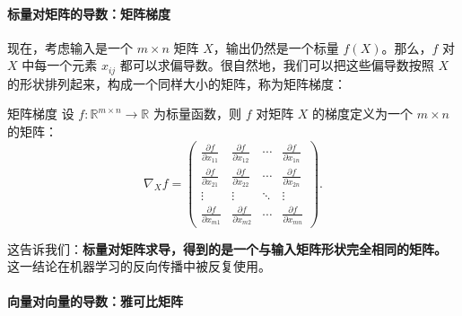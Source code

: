 \paragraph{标量对矩阵的导数：矩阵梯度}

现在，考虑输入是一个 $m \times n$ 矩阵 $X$，输出仍然是一个标量 $f(X)$。那么，$f$ 对 $X$ 中每一个元素 $x_{ij}$ 都可以求偏导数。很自然地，我们可以把这些偏导数按照 $X$ 的形状排列起来，构成一个同样大小的矩阵，称为矩阵梯度：
\begin{definition}{矩阵梯度}{}
    设 $f: \mathbb{R}^{m \times n} \to \mathbb{R}$ 为标量函数，则 $f$ 对矩阵 $X$ 的梯度定义为一个 $m \times n$ 的矩阵：
    \begin{equation}
        \nabla_X f =
        \begin{pmatrix}
            \frac{\partial f}{\partial x_{11}} & \frac{\partial f}{\partial x_{12}} & \cdots & \frac{\partial f}{\partial x_{1n}} \\[4pt]
            \frac{\partial f}{\partial x_{21}} & \frac{\partial f}{\partial x_{22}} & \cdots & \frac{\partial f}{\partial x_{2n}} \\
            \vdots & \vdots & \ddots & \vdots \\
            \frac{\partial f}{\partial x_{m1}} & \frac{\partial f}{\partial x_{m2}} & \cdots & \frac{\partial f}{\partial x_{mn}}
        \end{pmatrix} .
    \end{equation}
\end{definition}

这告诉我们：\textbf{标量对矩阵求导，得到的是一个与输入矩阵形状完全相同的矩阵。} 这一结论在机器学习的反向传播中被反复使用。

\paragraph{向量对向量的导数：雅可比矩阵}

